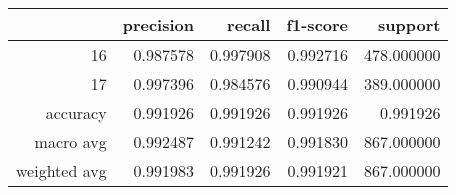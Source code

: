 \begin{tabular}{rrrrr}
\toprule
 & precision & recall & f1-score & support \\
\midrule
16 & 0.987578 & 0.997908 & 0.992716 & 478.000000 \\
17 & 0.997396 & 0.984576 & 0.990944 & 389.000000 \\
accuracy & 0.991926 & 0.991926 & 0.991926 & 0.991926 \\
macro avg & 0.992487 & 0.991242 & 0.991830 & 867.000000 \\
weighted avg & 0.991983 & 0.991926 & 0.991921 & 867.000000 \\
\bottomrule
\end{tabular}
